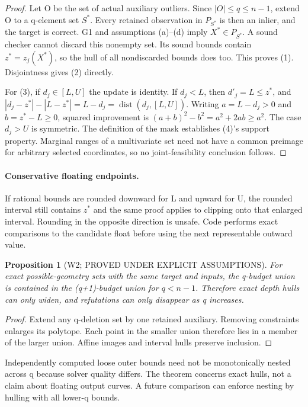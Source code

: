 \documentclass[11pt]{article}
\newtheorem{proposition}{Proposition}
\begin{document}
\begin{proof}
Let O be the set of actual auxiliary outliers. Since $|O|\le q\le n-1$, extend O to a q-element set $S^*$. Every retained observation in $P_{S^*}$ is then an inlier, and the target is correct. G1 and assumptions (a)--(d) imply $X^*\in P_{S^*}$. A sound checker cannot discard this nonempty set. Its sound bounds contain $z^*=z_j(X^*)$, so the hull of all nondiscarded bounds does too. This proves (1). Disjointness gives (2) directly.

For (3), if $d_j\in[L,U]$ the update is identity. If $d_j<L$, then $d'_j=L\le z^*$, and $|d_j-z^*|-|L-z^*|=L-d_j=\operatorname{dist}(d_j,[L,U])$. Writing $a=L-d_j>0$ and $b=z^*-L\ge0$, squared improvement is $(a+b)^2-b^2=a^2+2ab\ge a^2$. The case $d_j>U$ is symmetric. The definition of the mask establishes (4)'s support property. Marginal ranges of a multivariate set need not have a common preimage for arbitrary selected coordinates, so no joint-feasibility conclusion follows.
\end{proof}

\paragraph{Conservative floating endpoints.}
If rational bounds are rounded downward for L and upward for U, the rounded interval still contains $z^*$ and the same proof applies to clipping onto that enlarged interval. Rounding in the opposite direction is unsafe. Code performs exact comparisons to the candidate float before using the next representable outward value.

\begin{proposition}[W2; PROVED UNDER EXPLICIT ASSUMPTIONS]
For exact possible-geometry sets with the same target and inputs, the q-budget union is contained in the (q+1)-budget union for $q<n-1$. Therefore exact depth hulls can only widen, and refutations can only disappear as q increases.
\end{proposition}
\begin{proof}
Extend any q-deletion set by one retained auxiliary. Removing constraints enlarges its polytope. Each point in the smaller union therefore lies in a member of the larger union. Affine images and interval hulls preserve inclusion.
\end{proof}
Independently computed loose outer bounds need not be monotonically nested across q because solver quality differs. The theorem concerns exact hulls, not a claim about floating output curves. A future comparison can enforce nesting by hulling with all lower-q bounds.
\end{document}
